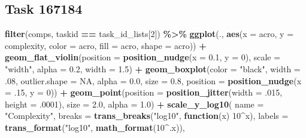 \documentclass[
]{book}
\newenvironment{Shaded}{\begin{snugshade}}{\end{snugshade}}
\newcommand{\AttributeTok}[1]{\textcolor[rgb]{0.13,0.29,0.53}{#1}}
\newcommand{\ConstantTok}[1]{\textcolor[rgb]{0.56,0.35,0.01}{#1}}
\newcommand{\ControlFlowTok}[1]{\textcolor[rgb]{0.13,0.29,0.53}{\textbf{#1}}}
\newcommand{\DecValTok}[1]{\textcolor[rgb]{0.00,0.00,0.81}{#1}}
\newcommand{\FloatTok}[1]{\textcolor[rgb]{0.00,0.00,0.81}{#1}}
\newcommand{\FunctionTok}[1]{\textcolor[rgb]{0.13,0.29,0.53}{\textbf{#1}}}
\newcommand{\NormalTok}[1]{#1}
\newcommand{\SpecialCharTok}[1]{\textcolor[rgb]{0.81,0.36,0.00}{\textbf{#1}}}
\newcommand{\StringTok}[1]{\textcolor[rgb]{0.31,0.60,0.02}{#1}}
\begin{document}
\hypertarget{task-167184-1}{%
\subsection{Task 167184}\label{task-167184-1}}

\begin{Shaded}
\begin{Highlighting}[]
\FunctionTok{filter}\NormalTok{(comps, taskid }\SpecialCharTok{==}\NormalTok{ task\_id\_lists[}\DecValTok{2}\NormalTok{]) }\SpecialCharTok{\%\textgreater{}\%}
  \FunctionTok{ggplot}\NormalTok{(., }\FunctionTok{aes}\NormalTok{(}\AttributeTok{x =}\NormalTok{ acro, }\AttributeTok{y =}\NormalTok{ complexity, }\AttributeTok{color =}\NormalTok{ acro,}
                \AttributeTok{fill =}\NormalTok{ acro, }\AttributeTok{shape =}\NormalTok{ acro)) }\SpecialCharTok{+}
  \FunctionTok{geom\_flat\_violin}\NormalTok{(}\AttributeTok{position =} \FunctionTok{position\_nudge}\NormalTok{(}\AttributeTok{x =} \FloatTok{0.1}\NormalTok{, }\AttributeTok{y =} \DecValTok{0}\NormalTok{),}
                   \AttributeTok{scale =} \StringTok{"width"}\NormalTok{, }\AttributeTok{alpha =} \FloatTok{0.2}\NormalTok{, }\AttributeTok{width =} \FloatTok{1.5}\NormalTok{) }\SpecialCharTok{+}
  \FunctionTok{geom\_boxplot}\NormalTok{(}\AttributeTok{color =} \StringTok{"black"}\NormalTok{, }\AttributeTok{width =}\NormalTok{ .}\DecValTok{08}\NormalTok{, }\AttributeTok{outlier.shape =} \ConstantTok{NA}\NormalTok{, }\AttributeTok{alpha =} \FloatTok{0.0}\NormalTok{,}
               \AttributeTok{size =} \FloatTok{0.8}\NormalTok{, }\AttributeTok{position =} \FunctionTok{position\_nudge}\NormalTok{(}\AttributeTok{x =}\NormalTok{ .}\DecValTok{15}\NormalTok{, }\AttributeTok{y =} \DecValTok{0}\NormalTok{)) }\SpecialCharTok{+}
  \FunctionTok{geom\_point}\NormalTok{(}\AttributeTok{position =} \FunctionTok{position\_jitter}\NormalTok{(}\AttributeTok{width =}\NormalTok{ .}\DecValTok{015}\NormalTok{, }\AttributeTok{height =}\NormalTok{ .}\DecValTok{0001}\NormalTok{),}
             \AttributeTok{size =} \FloatTok{2.0}\NormalTok{, }\AttributeTok{alpha =} \FloatTok{1.0}\NormalTok{) }\SpecialCharTok{+}
  \FunctionTok{scale\_y\_log10}\NormalTok{(}
    \AttributeTok{name =} \StringTok{"Complexity"}\NormalTok{,}
    \AttributeTok{breaks =} \FunctionTok{trans\_breaks}\NormalTok{(}\StringTok{"log10"}\NormalTok{, }\ControlFlowTok{function}\NormalTok{(x) }\DecValTok{10}\SpecialCharTok{\^{}}\NormalTok{x),}
    \AttributeTok{labels =} \FunctionTok{trans\_format}\NormalTok{(}\StringTok{"log10"}\NormalTok{, }\FunctionTok{math\_format}\NormalTok{(}\DecValTok{10}\SpecialCharTok{\^{}}\NormalTok{.x)),}


\end{Highlighting}
\end{Shaded}
\end{document}
